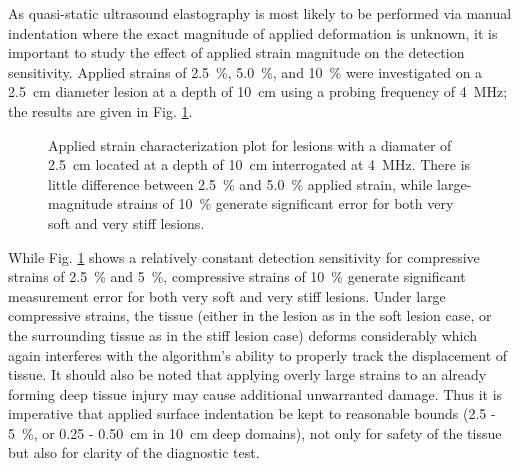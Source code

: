 			As quasi-static ultrasound elastography is most likely to be performed via manual indentation where the exact magnitude of applied deformation is unknown, it is important to study the effect of applied strain magnitude on the detection sensitivity. Applied strains of \SI{2.5}{\percent}, \SI{5.0}{\percent}, and \SI{10}{\percent} were investigated on a \SI{2.5}{cm} diameter lesion at a depth of \SI{10}{cm} using a probing frequency of \SI{4}{MHz}; the results are given in Fig. \ref{fig:strain_characterization}.

			\begin{figure}[!t]
				\centering
				\caption[Applied strain characterization]{Applied strain characterization plot for lesions with a diamater of \SI{2.5}{cm} located at a depth of \SI{10}{cm} interrogated at \SI{4}{MHz}. There is little difference between \SI{2.5}{\percent} and \SI{5.0}{\percent} applied strain, while large-magnitude strains of \SI{10}{\percent} generate significant error for both very soft and very stiff lesions.}
				\label{fig:strain_characterization}
			\end{figure}

			While Fig. \ref{fig:strain_characterization} shows a relatively constant detection sensitivity for compressive strains of \SI{2.5}{\percent} and \SI{5}{\percent}, compressive strains of \SI{10}{\percent} generate significant measurement error for both very soft and very stiff lesions. Under large compressive strains, the tissue (either in the lesion as in the soft lesion case, or the surrounding tissue as in the stiff lesion case) deforms considerably which again interferes with the algorithm's ability to properly track the displacement of tissue. It should also be noted that applying overly large strains to an already forming deep tissue injury may cause additional unwarranted damage. Thus it is imperative that applied surface indentation be kept to reasonable bounds (\SI{2.5 - 5}{\percent}, or \SI{0.25 - 0.50}{cm} in \SI{10}{cm} deep domains), not only for safety of the tissue but also for clarity of the diagnostic test.

